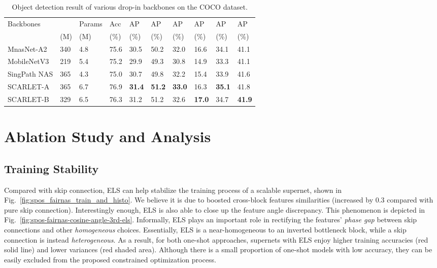 \documentclass[runningheads]{llncs}
\begin{document}
\setlength{\tabcolsep}{4pt}
\begin{table}
	\begin{center}
		\caption{Object detection result of various drop-in backbones on the COCO dataset.}
		\label{table:scarlet-coco-retina}
		\begin{tabular}{*{2}{|l}|H*{7}{l|}}
			\hline
			Backbones &   & Params &Acc    & AP & AP & AP & AP & AP & AP \\
& (M) & (M) & (\%) &(\%) & (\%)& (\%)&(\%) &(\%) &(\%) \\
			\hline
			MnasNet-A2 \cite{tan2018mnasnet} & 340& 4.8 & 75.6 & 30.5 & 50.2 & 32.0 & 16.6 & 34.1 & 41.1\\
			MobileNetV3 \cite{howard2019searching} & 219 & 5.4 & 75.2& 29.9 & 49.3 & 30.8 & 14.9 & 33.3 & 41.1\\

SingPath NAS \cite{stamoulis2019single} & 365 & 4.3 & 75.0 & 30.7 & 49.8 & 32.2 & 15.4 &33.9 & 41.6\\
SCARLET-A &365&6.7&76.9&\textbf{31.4}& \textbf{51.2}& \textbf{33.0}& 16.3& \textbf{35.1}&41.8\\
			SCARLET-B &329&6.5&76.3&31.2 & 51.2& 32.6 & \textbf{17.0} & 34.7& \textbf{41.9}\\
\hline
		\end{tabular}
	\end{center}
\end{table}




\section{Ablation Study and Analysis}





\subsection{Training Stability}

Compared with skip connection, ELS can help stabilize the training process of a scalable supernet, shown in Fig.~\ref{fig:spos_fairnas_train_and_histo}. We believe it is due to boosted cross-block features similarities (increased by 0.3 compared with pure skip connection). Interestingly enough, ELS is also able to close up the feature angle discrepancy. This phenomenon is depicted in Fig.~\ref{fig:spos-fairnas-cosine-angle-3rd-els}. Informally, ELS plays an important role in rectifying the features' \emph{phase gap} between skip connections and other \emph{homogeneous} choices. Essentially, ELS is a near-homogeneous  to an inverted bottleneck block, while a skip connection is instead \emph{heterogeneous}.  As a result, for both one-shot approaches, supernets with ELS enjoy higher training accuracies (red solid line) and lower variances (red shaded area). Although there is a small proportion of one-shot models with low accuracy, they can be easily excluded from the proposed constrained optimization process.
\end{document}
